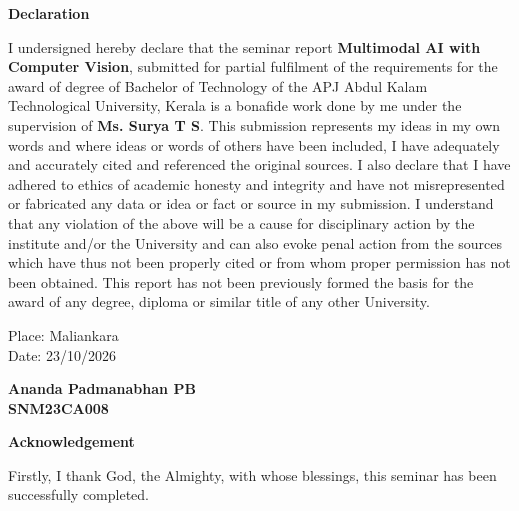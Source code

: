 \documentclass[12pt,a4paper,final]{extreport}
\begin{document}
\newpage

\thispagestyle{empty}
\begin{center}
\begin{huge}
\textbf{Declaration}
\end{huge}
\end{center}

\vskip0.5cm
I undersigned hereby declare that the seminar report \textbf{Multimodal AI with Computer Vision}, submitted for partial fulfilment of the requirements for the award of degree of Bachelor of Technology of the APJ Abdul Kalam Technological University, Kerala is a bonafide work done by me under the supervision of \textbf{Ms. Surya T S}. This submission represents my ideas in my own words and where ideas or words of others have been included, I have adequately and accurately cited and referenced the original sources. I also declare that I have adhered to ethics of academic honesty and integrity and have not misrepresented or fabricated any data or idea or fact or source in my submission. I understand that any violation of the above will be a cause for disciplinary action by the institute and/or the University and can also evoke penal action from the sources which have thus not been properly cited or from whom proper permission has not been obtained. This report has not been previously formed the basis for the award of any degree, diploma or similar title of any other University.

\vspace{2cm}
\noindent
\begin{minipage}[t]{0.5\textwidth}
Place: Maliankara\\
Date: 23/10/2026
\end{minipage}%
\hfill
\begin{minipage}[t]{0.4\textwidth}
\centering
\textbf{Ananda Padmanabhan PB}\\
\textbf{SNM23CA008}
\end{minipage}

\newpage
\thispagestyle{plain}
\setcounter{page}{1}
\begin{center}
\begin{huge}
\textbf{Acknowledgement}
\end{huge}
\end{center}
\vskip1cm
\hspace*{1 cm} Firstly, I thank God, the Almighty, with whose blessings, this seminar has been successfully completed.
\end{document}
